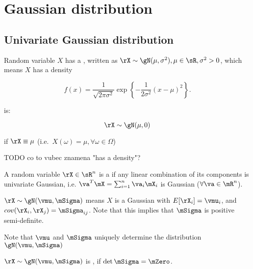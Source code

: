 \chapter{Gaussian distribution}


\section{Univariate Gaussian distribution}

\begin{defn}
  Random variable $X$ has a ,
  written as $\rX \sim \gN(\mu, \sigma^2), \mu \in \sR, \sigma^2 > 0$, which
  means $X$ has a density

  \begin{equation}
    f(x) = \frac{1}{\sqrt{2 \pi \sigma^2}} \exp{\left\{ -\frac{1}{2\sigma^2} (x - \mu)^2 \right\}}.
  \end{equation}
\end{defn}

\begin{defn}
   is:

  \begin{equation}
    \rX \sim \gN(\mu, 0)
  \end{equation}

  if $\rX \equiv \mu$ (i.e.\ $X(\omega) = \mu, \forall \omega \in \Omega$)
\end{defn}

\begin{defn}
  {TODO co to vubec znamena "has a density"?}

  A random variable $\rX \in \sR^n$ is a  if
  any linear combination of its components is univariate Gaussian, i.e.
  $\va^T \mX = \sum_{i=1}^n \va_i \mX_i$ is Gaussian ($\forall \va \in
  \mR^n$).
\end{defn}

\begin{defn}
  $\rX \sim \gN(\vmu, \mSigma)$ means $X$ is a Gaussian with $E[\rX_i] =
  \vmu_i$, and $cov(\rX_i, \rX_j) = \mSigma_{ij}$. Note that this implies
  that $\mSigma$ is positive semi-definite.
\end{defn}

\begin{rem}
  Note that $\vmu$ and $\mSigma$ uniquely determine the distribution
  $\gN(\vmu, \mSigma)$
\end{rem}

\begin{defn}
  $\rX \sim \gN(\vmu, \mSigma)$ is , if $\det \mSigma = \mZero$.
\end{defn}

